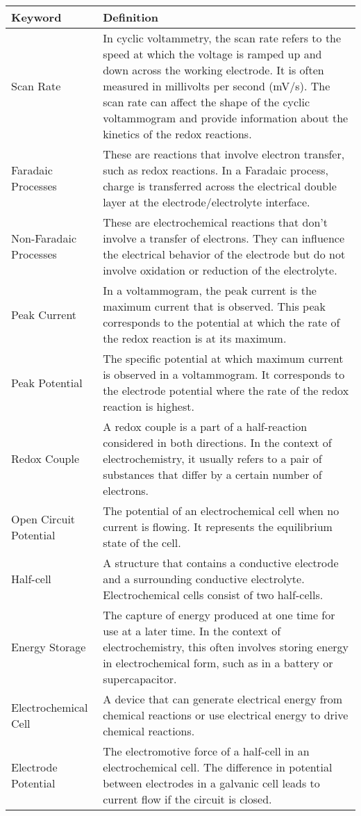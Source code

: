 \documentclass{article}
\begin{document}
\begin{table}[H]
  \centering
  \begin{tabular}{|l|p{10cm}|}
  \hline
  Keyword & Definition\\
  \hline
    Scan Rate & In cyclic voltammetry, the scan rate refers to the speed at which the voltage is ramped up and down across the working electrode. It is often measured in millivolts per second (mV/s). The scan rate can affect the shape of the cyclic voltammogram and provide information about the kinetics of the redox reactions.\\
    \hline
    Faradaic Processes & These are reactions that involve electron transfer, such as redox reactions. In a Faradaic process, charge is transferred across the electrical double layer at the electrode/electrolyte interface.\\
    \hline
    Non-Faradaic Processes & These are electrochemical reactions that don't involve a transfer of electrons. They can influence the electrical behavior of the electrode but do not involve oxidation or reduction of the electrolyte.\\
    \hline
    Peak Current & In a voltammogram, the peak current is the maximum current that is observed. This peak corresponds to the potential at which the rate of the redox reaction is at its maximum.\\
    \hline
    Peak Potential & The specific potential at which maximum current is observed in a voltammogram. It corresponds to the electrode potential where the rate of the redox reaction is highest.\\
    \hline
    Redox Couple & A redox couple is a part of a half-reaction considered in both directions. In the context of electrochemistry, it usually refers to a pair of substances that differ by a certain number of electrons.\\
    \hline
    Open Circuit Potential & The potential of an electrochemical cell when no current is flowing. It represents the equilibrium state of the cell.\\
    \hline
    Half-cell & A structure that contains a conductive electrode and a surrounding conductive electrolyte. Electrochemical cells consist of two half-cells.\\
    \hline
    Energy Storage & The capture of energy produced at one time for use at a later time. In the context of electrochemistry, this often involves storing energy in electrochemical form, such as in a battery or supercapacitor.\\
    \hline
    Electrochemical Cell & A device that can generate electrical energy from chemical reactions or use electrical energy to drive chemical reactions.\\
    \hline
    Electrode Potential & The electromotive force of a half-cell in an electrochemical cell. The difference in potential between electrodes in a galvanic cell leads to current flow if the circuit is closed.\\
    \hline
  \end{tabular}
\end{table}
\end{document}
